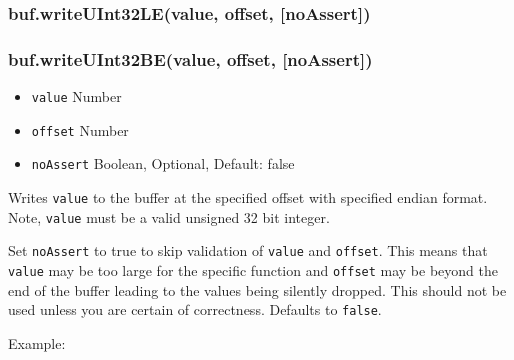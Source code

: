 \subsubsection{buf.writeUInt32LE(value, offset,
{[}noAssert{]})}\label{buf.writeuint32levalue-offset-noassert}

\subsubsection{buf.writeUInt32BE(value, offset,
{[}noAssert{]})}\label{buf.writeuint32bevalue-offset-noassert}

\begin{itemize}
\itemsep1pt\parskip0pt
\item
  \texttt{value} Number
\item
  \texttt{offset} Number
\item
  \texttt{noAssert} Boolean, Optional, Default: false
\end{itemize}

Writes \texttt{value} to the buffer at the specified offset with
specified endian format. Note, \texttt{value} must be a valid unsigned
32 bit integer.

Set \texttt{noAssert} to true to skip validation of \texttt{value} and
\texttt{offset}. This means that \texttt{value} may be too large for the
specific function and \texttt{offset} may be beyond the end of the
buffer leading to the values being silently dropped. This should not be
used unless you are certain of correctness. Defaults to \texttt{false}.

Example:

\begin{Shaded}
\begin{Highlighting}[]
  \NormalTok{(}\NormalTok{);}
\NormalTok{(}\NormalTok{, }\NormalTok{);}


\NormalTok{(}\NormalTok{, }\NormalTok{);}


\end{Highlighting}
\end{Shaded}

